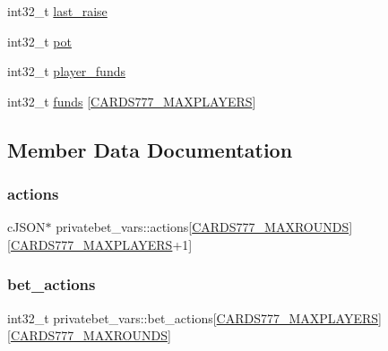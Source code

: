 \begin{DoxyCompactItemize}
\item 
int32\+\_\+t \hyperlink{structprivatebet__vars_afee2532af1662a5b177f02207be87704}{last\+\_\+raise}
\item 
int32\+\_\+t \hyperlink{structprivatebet__vars_a1b05ab6687bf00d8f08bfd424531e795}{pot}
\item 
int32\+\_\+t \hyperlink{structprivatebet__vars_a0b69fe1b272370c73a04671e4a04fff0}{player\+\_\+funds}
\item 
int32\+\_\+t \hyperlink{structprivatebet__vars_acb9cb80d690397299df31c2495f5ae87}{funds} \mbox{[}\hyperlink{common_8h_a97d6188fd175f4ea7268e9445107a7c0}{C\+A\+R\+D\+S777\+\_\+\+M\+A\+X\+P\+L\+A\+Y\+E\+RS}\mbox{]}
\end{DoxyCompactItemize}


\subsection{Member Data Documentation}
\mbox{\label{structprivatebet__vars_a9cc412a623fde59fcd173ca97b504cde}} 
\subsubsection{\texorpdfstring{actions}{actions}}
{\footnotesize\ttfamily c\+J\+S\+ON$\ast$ privatebet\+\_\+vars\+::actions\mbox{[}\hyperlink{common_8h_aa7cb3dc82286cdcfc50250b3ec3ae769}{C\+A\+R\+D\+S777\+\_\+\+M\+A\+X\+R\+O\+U\+N\+DS}\mbox{]}\mbox{[}\hyperlink{common_8h_a97d6188fd175f4ea7268e9445107a7c0}{C\+A\+R\+D\+S777\+\_\+\+M\+A\+X\+P\+L\+A\+Y\+E\+RS}+1\mbox{]}}

\mbox{\label{structprivatebet__vars_a381939fb9b7f85c0b09f3af728eb5b42}} 
\subsubsection{\texorpdfstring{bet\+\_\+actions}{bet\_actions}}
{\footnotesize\ttfamily int32\+\_\+t privatebet\+\_\+vars\+::bet\+\_\+actions\mbox{[}\hyperlink{common_8h_a97d6188fd175f4ea7268e9445107a7c0}{C\+A\+R\+D\+S777\+\_\+\+M\+A\+X\+P\+L\+A\+Y\+E\+RS}\mbox{]}\mbox{[}\hyperlink{common_8h_aa7cb3dc82286cdcfc50250b3ec3ae769}{C\+A\+R\+D\+S777\+\_\+\+M\+A\+X\+R\+O\+U\+N\+DS}\mbox{]}}

